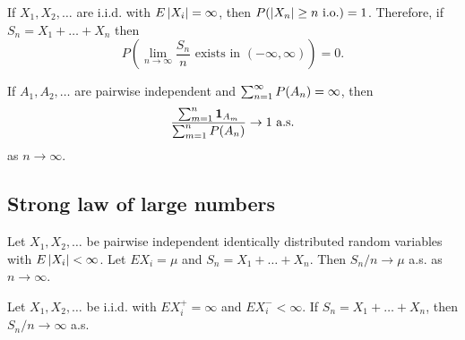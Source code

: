\documentclass[a4paper]{article}
\begin{document}
\begin{thm}
  If $X_1, X_2, \dots$ are i.i.d. with $E \left\lvert X_i\right\rvert = \infty$, then 
  $P(\left\lvert X_n\right\rvert \geq n \text{ i.o.}) = 1$. Therefore, if $S_n = X_1
  + \dots + X_n$ then 
  \[
  P \left( \lim_{n \to \infty} \frac{S_n}{n} \text{ exists in $(-\infty, 
  \infty)$} \right) = 0.
  \]
\end{thm}

\begin{thm}
  If $A_1, A_2, \dots$ are pairwise independent and $\sum_{n=1}^\infty P(A_n)
  = \infty$, then 
  \[
  \frac{\sum_{m=1}^n \operatorname{\mathbf{1}}_{A_m}}{\sum_{m=1}^n P(A_n)} \to 1 \text{ a.s.}
  \]
  as $n \to \infty$.
\end{thm}

\subsection{Strong law of large numbers}

\begin{thm}
  Let $X_1, X_2, \dots$ be pairwise independent identically distributed
  random variables with $E \left\lvert X_i\right\rvert < \infty$. Let $E X_i = \mu$ and 
  $S_n = X_1 + \dots + X_n$. Then $S_n / n \to \mu$ a.s. 
  as $n \to \infty$.
\end{thm}

\begin{thm}
  Let $X_1, X_2, \dots$ be i.i.d. with $E X_i^+ = \infty$ and 
  $E X_i^- < \infty$. If $S_n = X_1 + \dots + X_n$,
  then $S_n / n \to \infty$ a.s.
\end{thm}
\end{document}
